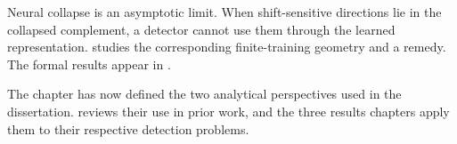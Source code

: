 Neural collapse is an asymptotic limit. When shift-sensitive directions lie in the
collapsed complement, a detector cannot use them through the learned
representation.  studies the corresponding
finite-training geometry and a remedy. The formal results appear in
.

The chapter has now defined the two analytical perspectives used in the
dissertation.  reviews their use in prior work, and the
three results chapters apply them to their respective detection problems.

